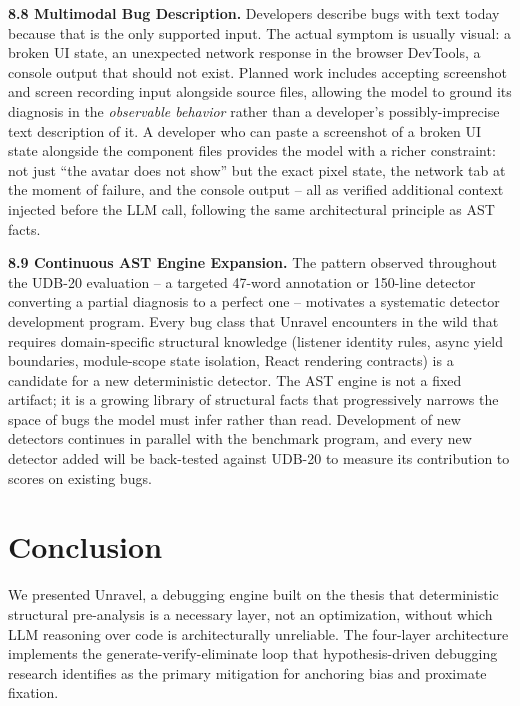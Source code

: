 \documentclass[12pt,a4paper]{article}
\begin{document}
\textbf{8.8 \; Multimodal Bug Description.}
Developers describe bugs with text today because that is the only supported input.
The actual symptom is usually visual: a broken UI state, an unexpected network response
in the browser DevTools, a console output that should not exist. Planned work includes
accepting screenshot and screen recording input alongside source files, allowing the
model to ground its diagnosis in the \textit{observable behavior} rather than a
developer's possibly-imprecise text description of it. A developer who can paste a
screenshot of a broken UI state alongside the component files provides the model with
a richer constraint: not just ``the avatar does not show'' but the exact pixel state,
the network tab at the moment of failure, and the console output -- all as verified
additional context injected before the LLM call, following the same architectural
principle as AST facts.

\textbf{8.9 \; Continuous AST Engine Expansion.}
The pattern observed throughout the UDB-20 evaluation -- a targeted 47-word annotation
or 150-line detector converting a partial diagnosis to a perfect one -- motivates a
systematic detector development program. Every bug class that Unravel encounters in
the wild that requires domain-specific structural knowledge (listener identity rules,
async yield boundaries, module-scope state isolation, React rendering contracts) is a
candidate for a new deterministic detector. The AST engine is not a fixed artifact;
it is a growing library of structural facts that progressively narrows the space of
bugs the model must infer rather than read. Development of new detectors continues
in parallel with the benchmark program, and every new detector added will be
back-tested against UDB-20 to measure its contribution to scores on existing bugs.

\section{Conclusion}

We presented Unravel, a debugging engine built on the thesis that deterministic structural
pre-analysis is a necessary layer, not an optimization, without which LLM reasoning over
code is architecturally unreliable. The four-layer architecture implements the
generate-verify-eliminate loop that hypothesis-driven debugging research identifies as the
primary mitigation for anchoring bias and proximate fixation.
\end{document}
